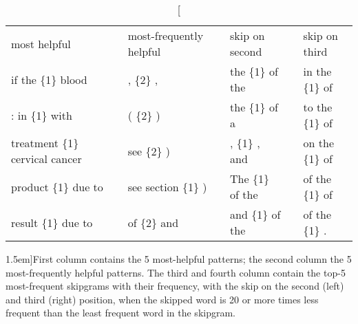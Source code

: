 \begin{table*}
	\small
	\begin{tabular}{lllllll}
		most helpful  & & most-frequently helpful & & skip on second & & skip on third \\ \cline{1-1}\cline{3-3}\cline{5-5}\cline{7-7}
		if the \{1\} blood & & , \{2\} , & & the \{1\} of the &  & in the \{1\} of\\
		: in \{1\} with & & ( \{2\} ) & & the \{1\} of a   & & to the \{1\} of\\
		treatment \{1\} cervical cancer   & & see \{2\} ) & & , \{1\} , and    & & on the \{1\} of\\
		product \{1\} due to & & see section \{1\} ) & & The \{1\} of the & & of the \{1\} of\\
		result \{1\} due to & & of \{2\} and & & and \{1\} of the & & of the \{1\} . \\
	\end{tabular}
	\caption[][1.5em]{First column contains the 5 most-helpful patterns; the second column the 5 most-frequently helpful patterns. The third and fourth column contain the top-5 most-frequent skipgrams with their frequency, with the skip on the second (left) and third (right) position, when the skipped word is 20 or more times less frequent than the least frequent word in the skipgram.}\label{ta:examples}
\end{table*}




